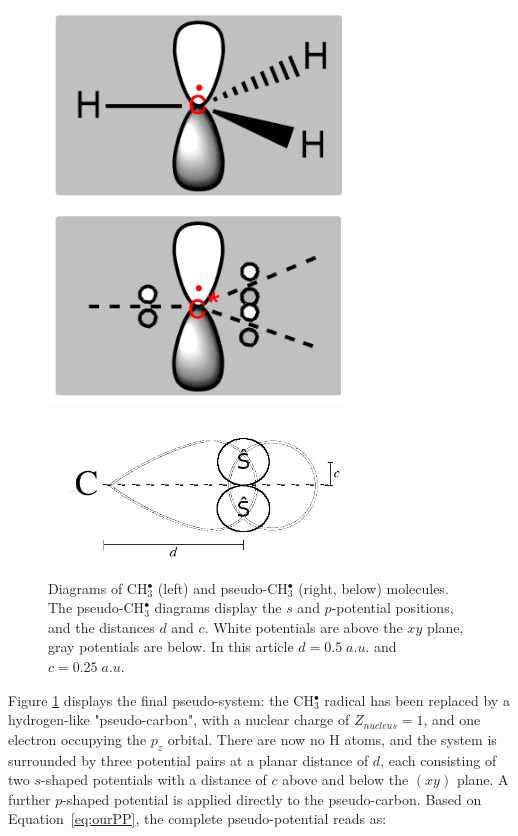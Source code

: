 \documentclass[aip]{revtex4-1}
\begin{document}
\begin{figure}
\begin{center}
\includegraphics[width=8cm]{ch3.png}
\includegraphics[width=8cm]{pseudoch3.png}
\includegraphics[width=8cm]{tm_sp2_potentials.png}
\end{center}
\caption{Diagrams of CH\(^{\bullet}_{3}\) (left) and pseudo-CH\(^{\bullet}_{3}\)
(right, below) molecules.
The pseudo-CH\(^{\bullet}_{3}\) diagrams display the \(s\) and \(p\)-potential positions,
and the distances \(d\) and \(c\). White potentials are above the $xy$ plane, 
gray potentials are below.
In this article $d=0.5\;a.u.$ and $c=0.25\;a.u.$}
\label{figure:ref_pseudo_diagram}
\end{figure}

Figure \ref{figure:ref_pseudo_diagram} displays the final pseudo-system: the CH\(^{\bullet}_{3}\) radical has been replaced by
a hydrogen-like "pseudo-carbon", with a nuclear charge of \(Z_{nucleus} = 1\), and one electron occupying the \(p_{z}\) orbital. 
There are now no H atoms, and the system is surrounded by three potential pairs at a planar distance of \(d\), each consisting of 
two \(s\)-shaped potentials with a distance of \(c\) above and below the \((xy)\) plane. 
A further \(p\)-shaped potential is applied directly to the pseudo-carbon.
Based on Equation~\ref{eq:ourPP}, the complete pseudo-potential reads as:
\end{document}
